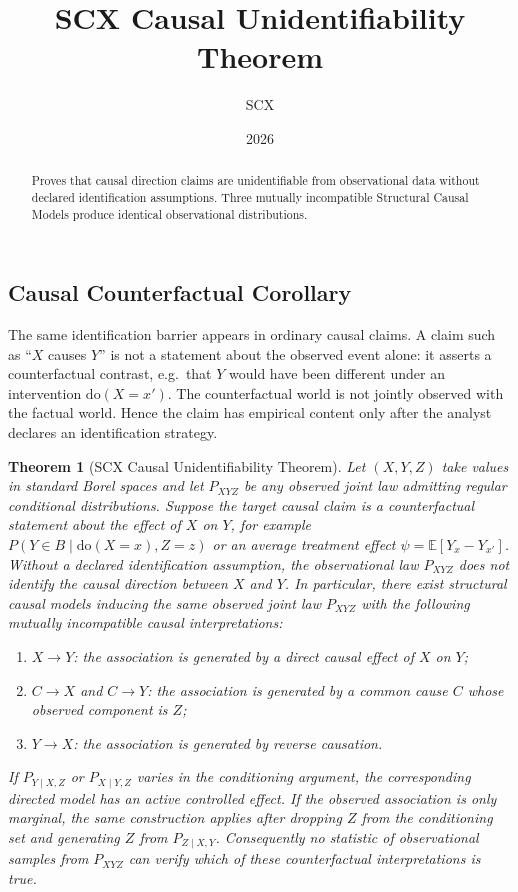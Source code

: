 \documentclass[11pt,a4paper]{article}
\title{SCX Causal Unidentifiability Theorem}
\author{SCX}
\date{2026}
\newtheorem{theorem}{Theorem}[section]
\theoremstyle{definition}
\begin{document}
\maketitle

\begin{abstract}
Proves that causal direction claims are unidentifiable from observational data without declared identification assumptions. Three mutually incompatible Structural Causal Models produce identical observational distributions.
\end{abstract}
\subsection{Causal Counterfactual Corollary}
\label{subsec:causal_counterfactual}

The same identification barrier appears in ordinary causal claims.  A claim
such as ``$X$ causes $Y$'' is not a statement about the observed event alone:
it asserts a counterfactual contrast, e.g.\ that $Y$ would have been different
under an intervention $\mathrm{do}(X=x')$.  The counterfactual world is not
jointly observed with the factual world.  Hence the claim has empirical
content only after the analyst declares an identification strategy.

\begin{theorem}[SCX Causal Unidentifiability Theorem]
\label{thm:causal_unident}
Let $(X,Y,Z)$ take values in standard Borel spaces and let
$P_{XYZ}$ be any observed joint law admitting regular conditional
distributions.  Suppose the target causal claim is a counterfactual
statement about the effect of $X$ on $Y$, for example
$P(Y \in B \mid \mathrm{do}(X=x),Z=z)$ or an average treatment effect
$\psi = \mathbb{E}[Y_x - Y_{x'}]$.  Without a declared identification
assumption, the observational law $P_{XYZ}$ does not identify the causal
direction between $X$ and $Y$.  In particular, there exist structural causal
models inducing the same observed joint law $P_{XYZ}$ with the following
mutually incompatible causal interpretations:
\begin{enumerate}[label=(\alph*), leftmargin=*]
    \item $X \to Y$: the association is generated by a direct causal effect
    of $X$ on $Y$;
    \item $C \to X$ and $C \to Y$: the association is generated by a common
    cause $C$ whose observed component is $Z$;
    \item $Y \to X$: the association is generated by reverse causation.
\end{enumerate}
If $P_{Y\mid X,Z}$ or $P_{X\mid Y,Z}$ varies in the conditioning argument,
the corresponding directed model has an active controlled effect.  If the
observed association is only marginal, the same construction applies after
dropping $Z$ from the conditioning set and generating $Z$ from
$P_{Z\mid X,Y}$.
Consequently no statistic of observational samples from $P_{XYZ}$ can
verify which of these counterfactual interpretations is true.
\end{theorem}
\end{document}
